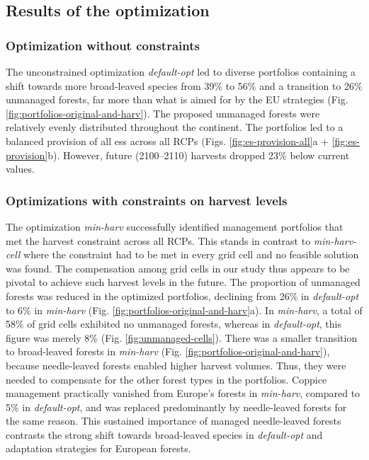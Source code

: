 \documentclass[]{article}
\begin{document}
\subsection{Results of the optimization}



\subsubsection{Optimization without constraints}
The unconstrained optimization \textit{default-opt} led to diverse portfolios containing a shift towards more broad-leaved species from 39\% to 56\% and a transition to 26\% unmanaged forests, far more than what is aimed for by the EU strategies (Fig. \ref{fig:portfolios-original-and-harv}).
The proposed unmanaged forests were relatively evenly distributed throughout the continent.
The portfolios led to a balanced provision of all \glspl{es} across all RCPs (Figs. \ref{fig:es-provision-all}a + \ref{fig:es-provision}b).
However, future (2100--2110) harvests dropped 23\% below current values.

\subsubsection{Optimizations with constraints on harvest levels}

The optimization \textit{min-harv} successfully identified management portfolios that met the harvest constraint across all RCPs. This stands in contrast to \textit{min-harv-cell} where the constraint had to be met in every grid cell and no feasible solution was found. The compensation among grid cells in our study thus appears to be pivotal to achieve such harvest levels in the future.
The proportion of unmanaged forests was reduced in the optimized portfolios, declining from 26\% in \textit{default-opt} to 6\% in \textit{min-harv} (Fig. \ref{fig:portfolios-original-and-harv}a).
In \textit{min-harv}, a total of 58\% of grid cells exhibited no unmanaged forests, whereas in \textit{default-opt}, this figure was merely 8\% (Fig. \ref{fig:unmanaged-cells}).
There was a smaller transition to broad-leaved forests in \textit{min-harv} (Fig. \ref{fig:portfolios-original-and-harv}), because needle-leaved forests enabled higher harvest volumes. Thus, they were needed to compensate for the other forest types in the portfolios.
Coppice management practically vanished from Europe's forests in \textit{min-harv}, compared to 5\% in \textit{default-opt}, and was replaced predominantly by needle-leaved forests for the same reason.
This sustained importance of managed needle-leaved forests contrasts the strong shift towards broad-leaved species in \textit{default-opt} and adaptation strategies for European forests. 
\end{document}
